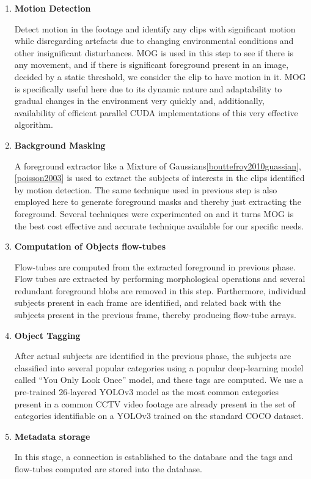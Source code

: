 \begin{enumerate}
    \item \textbf{Motion Detection}

    Detect motion in the footage and identify any clips with significant motion while disregarding artefacts due to changing environmental conditions and other insignificant disturbances.
    MOG is used in this step to see if there is any movement, and if there is significant foreground present in an image, decided by a static threshold, we consider the clip to have motion in it. MOG is specifically useful here due to its dynamic nature and adaptability to gradual changes in the environment very quickly and, additionally, availability of efficient parallel CUDA implementations of this very effective algorithm.

    \item \textbf{Background Masking}

	A foreground extractor like a Mixture of Gaussians\ref{bouttefroy2010guassian}, \ref{poisson2003} is used to extract the subjects of interests in the clips identified by motion detection.
    The same technique used in previous step is also employed here to generate foreground masks and thereby just extracting the foreground. Several techniques were experimented on and it turns MOG is the best cost effective and accurate technique available for our specific needs.

    \item \textbf{Computation of Objects flow-tubes}

	Flow-tubes are computed from the extracted foreground in previous phase.
    Flow tubes are extracted by performing morphological operations and several redundant foreground blobs are removed in this step. Furthermore, individual subjects present in each frame are identified, and related back with the subjects present in the previous frame, thereby producing flow-tube arrays.

    \item \textbf{Object Tagging}

	After actual subjects are identified in the previous phase, the subjects are classified into several popular categories using a popular deep-learning model called “You Only Look Once” model, and these tags are computed.
	We use a pre-trained 26-layered YOLOv3 model as the most common categories present in a common CCTV video footage are already present in the set of categories identifiable on a YOLOv3 trained on the standard COCO dataset.

    \item \textbf{Metadata storage}

    In this stage, a connection is established to the database and the tags and flow-tubes computed are stored into the database.
\end{enumerate}

